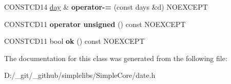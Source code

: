\begin{DoxyCompactItemize}
C\+O\+N\+S\+T\+C\+D14 \mbox{\hyperlink{classdate_1_1day}{day}} \& {\bfseries operator-\/=} (const days \&d) N\+O\+E\+X\+C\+E\+PT
\item 
\mbox{\label{classdate_1_1day_aaba97b08a40f5192cf7630798527c2a1}} 
C\+O\+N\+S\+T\+C\+D11 {\bfseries operator unsigned} () const N\+O\+E\+X\+C\+E\+PT
\item 
\mbox{\label{classdate_1_1day_aa700d7ae926546ee100777dfeaadbb8a}} 
C\+O\+N\+S\+T\+C\+D11 bool {\bfseries ok} () const N\+O\+E\+X\+C\+E\+PT
\end{DoxyCompactItemize}


The documentation for this class was generated from the following file\+:\begin{DoxyCompactItemize}
\item 
D\+:/\+\_\+git/\+\_\+github/simplelibs/\+Simple\+Core/date.\+h\end{DoxyCompactItemize}
